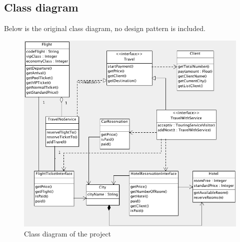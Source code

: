 \subsection{Class diagram}

Below is the original class diagram, no design pattern is included.

\begin{figure}[h]
\centering
\includegraphics[width=12cm]{project/images/overview.png}
\caption{Class diagram of the project}
\end{figure}